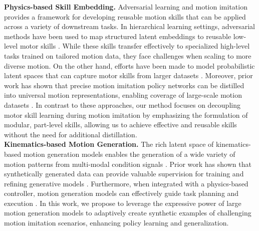 \noindent \textbf{Physics-based Skill Embedding.} Adversarial learning and motion imitation provides a framework for developing reusable motion skills that can be applied across a variety of downstream tasks. In hierarchical learning settings, adversarial methods have been used to map structured latent embeddings to reusable low-level motor skills \cite{2022-TOG-ASE, tessler2023calm, dou2022case, juravsky2022padl}. While these skills transfer effectively to specialized high-level tasks trained on tailored motion data, they face challenges when scaling to more diverse motion. 
On the other hand, efforts have been made to model probabilistic latent spaces that can capture motor skills from larger datasets \cite{PhysicsVAE, merel2018neural, ling2020character, zhu2023NCP}. Moreover, prior work has shown that precise motion imitation policy networks can be distilled into universal motion representations, enabling coverage of large-scale motion datasets \cite{wagener2022mocapact, luo2024universal, juravsky2024superpadl}. In contrast to these approaches, our method focuses on decoupling motor skill learning during motion imitation by emphasizing the formulation of modular, part-level skills, allowing us to achieve effective and reusable skills without the need for additional distillation.\\

\noindent \textbf{Kinematics-based Motion Generation.} The rich latent space of  kinematics-based motion generation models  enables the generation of a wide variety of motion patterns from multi-modal condition signals \cite{jiang2024motiongpt, tevet2023human, chen2023executing, Guo_2022_CVPR, zhang2023generating}. Prior work has shown that synthetically generated data can provide valuable supervision for training and refining generative models \cite{gillman2024selfcorrecting, xie2023template_free, Black_CVPR_2023}. Furthermore, when integrated with a physics-based controller, motion generation models can effectively guide task planning and execution \cite{tevet2024closdclosingloopsimulation, yuan2023physdiff, ren2023insactor}. In this work, we propose to leverage the expressive power of large motion generation models to adaptively create synthetic examples of challenging motion imitation scenarios, enhancing policy learning and generalization.\\

